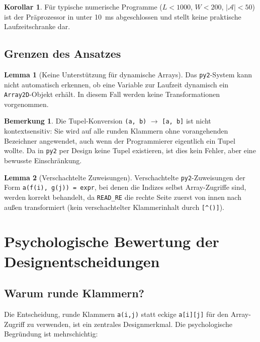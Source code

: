 ﻿\documentclass[a4paper,12pt]{article}
\theoremstyle{definition}
\newtheorem{lemma}{Lemma}
\newtheorem{bemerkung}{Bemerkung}
\newtheorem{korollar}{Korollar}
\begin{document}
\begin{korollar}
	F\"ur typische numerische Programme ($L < 1000$, $W < 200$, $|\mathcal{A}| < 50$)
	ist der Pr\"aprozessor in unter 10~ms abgeschlossen und stellt keine
	praktische Laufzeitschranke dar.
\end{korollar}

\subsection{Grenzen des Ansatzes}

\begin{lemma}[Keine Unterst\"utzung f\"ur dynamische Arrays]
	Das \texttt{py2}-System kann nicht automatisch erkennen, ob eine Variable
	zur Laufzeit dynamisch ein \texttt{Array2D}-Objekt erh\"alt. In diesem Fall
	werden keine Transformationen vorgenommen.
\end{lemma}

\begin{bemerkung}
	Die Tupel-Konversion \texttt{(a, b)} $\to$ \texttt{[a, b]} ist nicht kontextsensitiv:
	Sie wird auf alle runden Klammern ohne vorangehenden Bezeichner angewendet, auch wenn
	der Programmierer eigentlich ein Tupel wollte. Da in \texttt{py2} per Design keine
	Tupel existieren, ist dies kein Fehler, aber eine bewusste Einschr\"ankung.
\end{bemerkung}

\begin{lemma}[Verschachtelte Zuweisungen]
	Verschachtelte \texttt{py2}-Zuweisungen der Form
	\texttt{a(f(i), g(j)) = expr}, bei denen die Indizes selbst Array-Zugriffe sind,
	werden korrekt behandelt, da \texttt{READ\_RE} die rechte Seite zuerst von innen
	nach au\ss{}en transformiert (kein verschachtelter Klammerinhalt durch \texttt{[{\string^}()]}).
\end{lemma}

\section{Psychologische Bewertung der Designentscheidungen}

\subsection{Warum runde Klammern?}

Die Entscheidung, runde Klammern \texttt{a(i,j)} statt eckige \texttt{a[i][j]} f\"ur
den Array-Zugriff zu verwenden, ist ein zentrales Designmerkmal. Die psychologische
Begr\"undung ist mehrschichtig:
\end{document}
